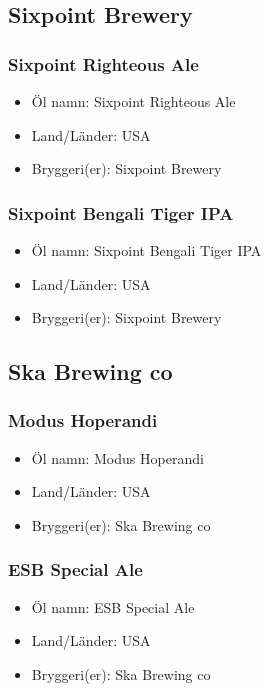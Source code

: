 \documentclass[11pt]{article}
\begin{document}
\subsection{Sixpoint Brewery}
\label{sec:org5a63a6a}
\subsubsection{Sixpoint Righteous Ale}
\label{sec:org468549a}
\begin{itemize}
\item Öl namn: Sixpoint Righteous Ale
\item Land/Länder: USA
\item Bryggeri(er): Sixpoint Brewery
\end{itemize}
\subsubsection{Sixpoint Bengali Tiger IPA}
\label{sec:org356500e}
\begin{itemize}
\item Öl namn: Sixpoint Bengali Tiger IPA
\item Land/Länder: USA
\item Bryggeri(er): Sixpoint Brewery
\end{itemize}
\subsection{Ska Brewing co}
\label{sec:org847cfe4}
\subsubsection{Modus Hoperandi}
\label{sec:orgea78c60}
\begin{itemize}
\item Öl namn: Modus Hoperandi
\item Land/Länder: USA
\item Bryggeri(er): Ska Brewing co
\end{itemize}
\subsubsection{ESB Special Ale}
\label{sec:org33cf90d}
\begin{itemize}
\item Öl namn: ESB Special Ale
\item Land/Länder: USA
\item Bryggeri(er): Ska Brewing co
\end{itemize}
\end{document}

